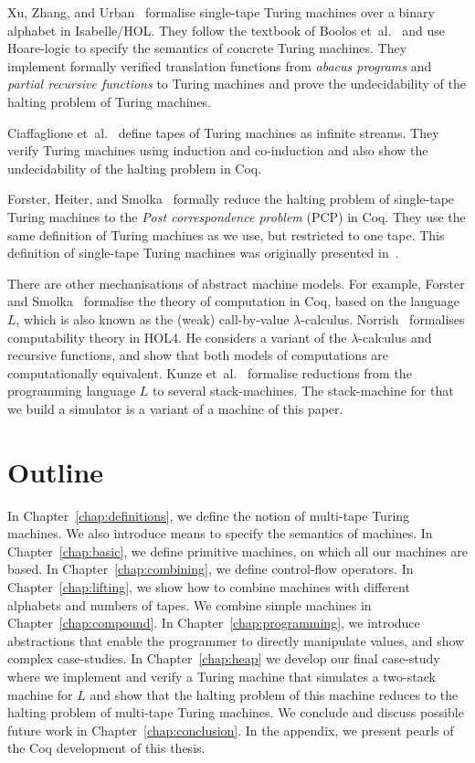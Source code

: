 Xu, Zhang, and Urban~\cite{xu2013} formalise single-tape Turing machines over a binary alphabet in Isabelle/HOL.  They follow the textbook of Boolos
et~al.~\cite{boolos2007computability} and use Hoare-logic to specify the semantics of concrete Turing machines.  They implement formally verified
translation functions from \textit{abacus programs} and \textit{partial recursive functions} to Turing machines and prove the undecidability of the
halting problem of Turing machines.

Ciaffaglione et~al.~\cite{ciaffaglione2016} define tapes of Turing machines as infinite streams.  They verify Turing machines using induction and
co-induction and also show the undecidability of the halting problem in Coq.

Forster, Heiter, and Smolka~\cite{PCPITP} formally reduce the halting problem of single-tape Turing machines to the \textit{Post correspondence
  problem} (PCP) in Coq.  They use the same definition of Turing machines as we use, but restricted to one tape.  This definition of single-tape
Turing machines was originally presented in~\cite{asperti2012}.

There are other mechanisations of abstract machine models.  For example, Forster and Smolka~\cite{forster2017weak} formalise the theory of computation
in Coq, based on the language~$L$, which is also known as the (weak) call-by-value $\lambda$-calculus.  Norrish~\cite{norrish2011mechanised}
formalises computability theory in HOL4.  He considers a variant of the $\lambda$-calculus and recursive functions, and show that both models of
computations are computationally equivalent.  Kunze et~al.~\cite{KunzeEtAl:2018:Formal} formalise reductions from the programming language $L$ to
several stack-machines.  The stack-machine for that we build a simulator is a variant of a machine of this paper.



\section{Outline}
\label{sec:outline}

In Chapter~\ref{chap:definitions}, we define the notion of multi-tape Turing machines.  We also introduce means to specify the semantics of machines.
In Chapter~\ref{chap:basic}, we define primitive machines, on which all our machines are based.  In Chapter~\ref{chap:combining}, we define
control-flow operators.  In Chapter~\ref{chap:lifting}, we show how to combine machines with different alphabets and numbers of tapes.  We combine
simple machines in Chapter~\ref{chap:compound}.  In Chapter~\ref{chap:programming}, we introduce abstractions that enable the programmer to directly
manipulate values, and show complex case-studies.  In Chapter~\ref{chap:heap} we develop our final case-study where we implement and verify a Turing
machine that simulates a two-stack machine for $L$ and show that the halting problem of this machine reduces to the halting problem of multi-tape
Turing machines.  We conclude and discuss possible future work in Chapter~\ref{chap:conclusion}.  In the appendix, we present pearls of the Coq
development of this thesis.

